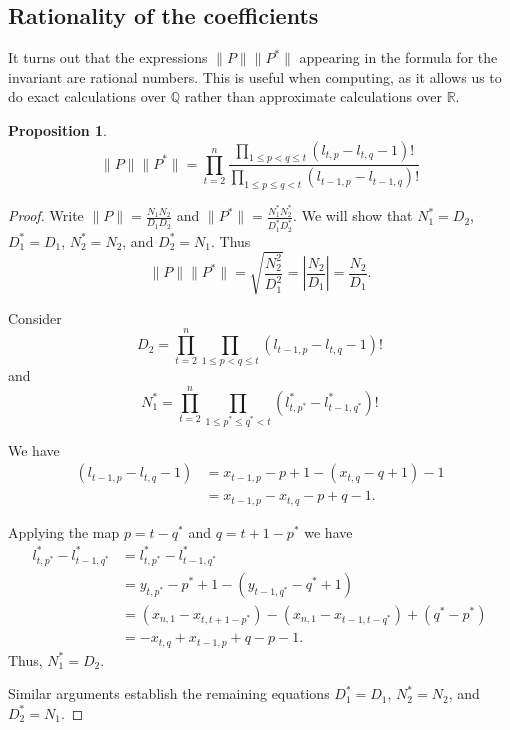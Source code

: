 \documentclass{amsart}[12pt]
\newtheorem{proposition}[theorem]{Proposition}
\theoremstyle{definition}
\numberwithin{equation}{section}
\begin{document}
\subsection{Rationality of the coefficients}

It turns out that the expressions $\| P \| \|P^{*} \|$ appearing in
the formula for the invariant are rational numbers. This is useful
when computing, as it allows us to do exact calculations over
$\mathbb{Q}$ rather than approximate calculations over $\mathbb{R}$. 


\begin{proposition}
\[
  \| P \| \|P^{*} \| = \prod_{t=2}^{n} \frac{\displaystyle \prod_{1
      \leq p < q \leq t}(l_{t,p}-l_{t,q}-1)!}{\displaystyle \prod_{1 \leq p \leq q < t}(l_{t-1,p}-l_{t-1,q})!}
\]
\end{proposition}
\begin{proof}
  Write $\| P \| = \frac{N_1 N_2}{D_1 D_2}$ and $\| P^{*} \| = \frac{N_1^{*} N_2^{*}}{D_1^{*} D_2^{*}}$. We will show that $N_1^{*} = D_2$, $D_1^{*} = D_1$, $N_2^{*}=N_2$, and $D_2^{*} =N_1$. Thus
  \[
    \| P \| \|P^{*} \| = \sqrt{\frac{N_2^2}{D_1^2}} = \left| \frac{N_2}{D_1} \right| = \frac{N_2}{D_1}.
\] 
  
Consider
\[
  D_2 = \displaystyle\prod_{t=2}^{n} \prod_{1 \leq p < q \leq t} (l_{t-1,p} - l_{t,q}-1)!
\]
 and
\[
N_1^{*} = \displaystyle\prod_{t=2}^{n}\prod_{1 \leq p^{*} \leq q^{*} < t} (l^{*}_{t,p^{*}} - l^{*}_{t-1,q^{*}})! 
\]

We have
\begin{align*}
  (l_{t-1,p} - l_{t,q}-1) &= x_{t-1,p}-p+1 - (x_{t,q}-q+1)-1\\
  &=x_{t-1,p}-x_{t,q} -p+q-1.
\end{align*}

Applying the map $p = t-q^{*}$ and $q = t+1-p^{*}$ we have
\begin{align*}
  l^{*}_{t,p^{*}} - l^{*}_{t-1,q^{*}} &= l^{*}_{t,p^{*}} - l^{*}_{t-1,q^{*}} \\
  &= y_{t,p^{*}}-p^{*}+1-(  y_{t-1,q^{*}} -q^{*}+1)\\
  &= (x_{n,1} - x_{t,t+1-p^{*}})-(x_{n,1} - x_{t-1,t-q^{*}})+(q^{*}-p^{*})\\
  &= -x_{t,q}+x_{t-1,p}+q-p-1.
\end{align*}
Thus, $N_1^{*} = D_2$.

Similar arguments establish the remaining equations $D_1^{*} = D_1$, $N_2^{*}=N_2$, and $D_2^{*} =N_1$. 

\end{proof}
\end{document}
